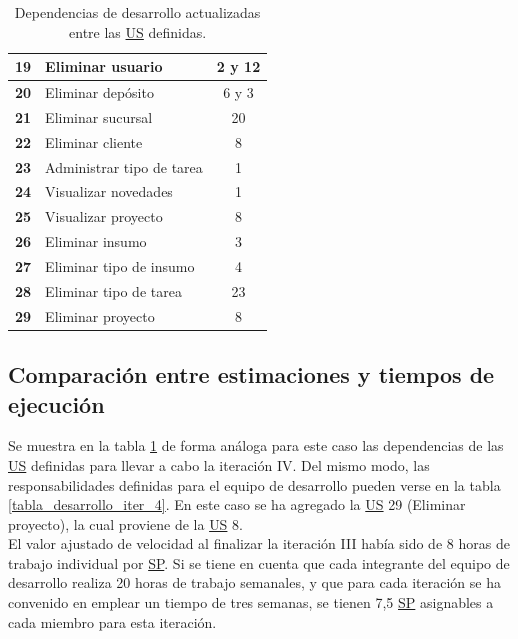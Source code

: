 \documentclass[a4paper, 12pt,twoside]{report}  %
\numberwithin{equation}{subsection} %
\begin{document}
\begin{table}[h!]
\begin{tabular}{ |p{0.5cm}|p{9cm}|c|  }
		\hline
		\textbf{19} & Eliminar usuario & 2 y 12 \\
		\hline
		\textbf{20} & Eliminar depósito & 6 y 3 \\
		\hline
		\textbf{21} & Eliminar sucursal & 20 \\
		\hline
		\textbf{22} & Eliminar cliente & 8 \\
		\hline
		\textbf{23} & \cellcolor{marca_US_realizada_anterior}Administrar tipo de tarea & 1 
		\\
		\hline
		\textbf{24} & \cellcolor{marca_US_realizada_anterior}Visualizar novedades & 1 
		\\
		\hline
		\textbf{25} & \cellcolor{marca_US_realizada}Visualizar proyecto & 8 
		\\
		\hline
		\textbf{26} & Eliminar insumo & 3 
		\\
		\hline
		\textbf{27} & Eliminar tipo de insumo & 4 
		\\
		\hline
		\textbf{28} & Eliminar tipo de tarea & 23 
		\\
		\hline
		\textbf{29} & Eliminar proyecto & 8 
		\\
		\hline
	\end{tabular}
	\caption{Dependencias de desarrollo actualizadas entre las \protect\hyperlink{US}{US} definidas.}
	\label{tabla_dependencias_us_it4}
\end{table}

\subsection{Comparación entre estimaciones y tiempos de ejecución}
Se muestra en la tabla \ref{tabla_dependencias_us_it4} de forma análoga para este caso las dependencias de las \hyperlink{US}{US} definidas para llevar a cabo la iteración IV. Del mismo modo, las responsabilidades definidas para el equipo de desarrollo pueden verse en la tabla \ref{tabla_desarrollo_iter_4}. En este caso se ha agregado la \hyperlink{US}{US} 29 (Eliminar proyecto), la cual proviene de la \hyperlink{US}{US} 8.\\
\indent El valor ajustado de velocidad al finalizar la iteración III había sido de 8 horas de trabajo individual por \hyperlink{SP}{SP}. Si se tiene en cuenta que cada integrante del equipo de desarrollo realiza 20 horas de trabajo semanales, y que para cada iteración se ha convenido en emplear un tiempo de tres semanas, se tienen 7,5 \hyperlink{SP}{SP} asignables a cada miembro para esta iteración.
\end{document}
